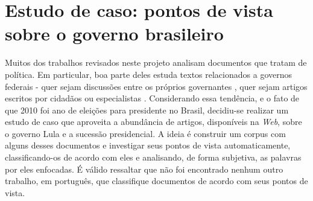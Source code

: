 \chapter{Estudo de caso: pontos de vista sobre o governo brasileiro}
\label{estudo}



Muitos dos trabalhos revisados neste projeto analisam documentos que tratam de política. Em particular, boa parte deles estuda textos relacionados a governos federais - quer sejam discussões entre os próprios governantes \cite{hirst-et-al}, quer sejam artigos escritos por cidadãos ou especialistas \cite{aaai-politics, malouf-taking_sides}. Considerando essa tendência, e o fato de que 2010 foi ano de eleições para presidente no Brasil, decidiu-se realizar um estudo de caso que aproveita a abundância de artigos, disponíveis na \emph{Web}, sobre o governo Lula e a sucessão presidencial. A ideia é construir um corpus com alguns desses documentos e investigar seus pontos de vista automaticamente, classificando-os de acordo com eles e analisando, de forma subjetiva, as palavras por eles enfocadas. É válido ressaltar que não foi encontrado nenhum outro trabalho, em português, que classifique documentos de acordo com seus pontos de vista.


